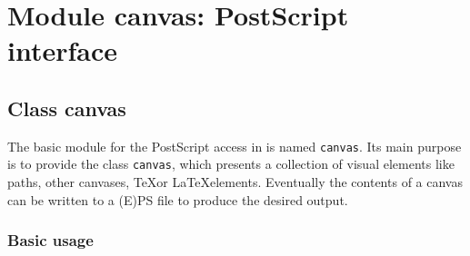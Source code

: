 \chapter{Module canvas: PostScript interface}

\label{canvas}

\section{Class canvas}

The basic module for the PostScript access in \PyX{} is named
\verb|canvas|. Its main purpose is to provide the class \verb|canvas|,
which presents a collection of visual elements like paths, other
canvases, \TeX or \LaTeX elements. Eventually the contents of a canvas 
can be written to a (E)PS file to produce the desired output.

\subsection{Basic usage}


